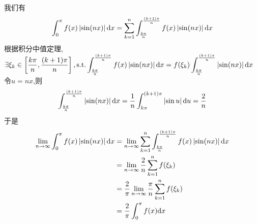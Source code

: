 \documentclass{ctexart}
\begin{document}
\begin{solution}[Proof.]
    我们有$$\int_0^\pi f(x)\left|\sin (nx)\right|\mathrm{d} x=\sum_{k=1}^{n}\int_{\frac{k\pi}{n}}^{\frac{(k+1)\pi}{n}}f(x)\left|\sin(nx)\right|\mathrm{d} x$$
    根据积分中值定理,$\displaystyle\exists\xi_k\in\left[\dfrac{k\pi}{n},\dfrac{(k+1)\pi}{n}\right],\text{s.t.}\int_{\frac{k\pi}{n}}^{\frac{(k+1)\pi}{n}}f(x)\left|\sin(nx)\right|\mathrm{d} x=f(\xi_k)\int_{\frac{k\pi}{n}}^{\frac{(k+1)\pi}{n}}\left|\sin(nx)\right|\mathrm{d} x$\\
    令$u=nx$,则$$\int_{\frac{k\pi}{n}}^{\frac{(k+1)\pi}{n}}\left|\sin(nx)\right|\mathrm{d} x=\dfrac{1}{n}\int_{k\pi}^{(k+1)\pi}\left|\sin u\right|\mathrm{d} u=\dfrac{2}{n}$$
    于是$$\begin{aligned}
        \lim_{n\to\infty}\int_0^\pi f(x)\left|\sin (nx)\right|\mathrm{d} x
        &= \lim_{n\to\infty}\sum_{k=1}^{n}\int_{\frac{k\pi}{n}}^{\frac{(k+1)\pi}{n}}f(x)\left|\sin(nx)\right|\mathrm{d} x \\
        &= \lim_{n\to\infty}\dfrac{2}{n}\sum_{k=1}^nf(\xi_k) \\
        &= \dfrac{2}{\pi}\lim_{n\to\infty}\dfrac{\pi}{n}\sum_{k=1}^{n}f(\xi_k) \\
        &= \dfrac{2}{\pi}\int_0^\pi f(x)\mathrm{d} x
    \end{aligned}$$
\end{solution}
\end{document}
